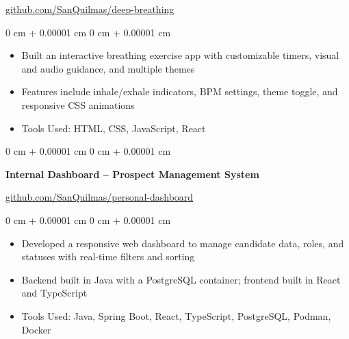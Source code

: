 \documentclass[10pt, letterpaper]{article}
\newenvironment{highlights}{
    \begin{itemize}[
        topsep=0.10 cm,
        parsep=0.10 cm,
        partopsep=0pt,
        itemsep=0pt,
        leftmargin=0 cm + 10pt
    ]
}{
    \end{itemize}
} %
\newenvironment{onecolentry}{
    \begin{adjustwidth}{
        0 cm + 0.00001 cm
    }{
        0 cm + 0.00001 cm
    }
}{
    \end{adjustwidth}
} %
\begin{document}
            \vspace{0.05 cm}
                \href{https://github.com/SanQuilmas/deep-breathing}{github.com/SanQuilmas/deep-breathing}
            \vspace{0.10 cm}
            \begin{onecolentry}
                \begin{highlights}
                    \item Built an interactive breathing exercise app with customizable timers, visual and audio guidance, and multiple themes
                    \item Features include inhale/exhale indicators, BPM settings, theme toggle, and responsive CSS animations
                    \item Tools Used: HTML, CSS, JavaScript, React
                \end{highlights}
            \end{onecolentry}
        \vspace{0.2 cm}
            \begin{onecolentry}
                \textbf{Internal Dashboard – Prospect Management System}
            \end{onecolentry}
            \vspace{0.05 cm}
                \href{https://github.com/SanQuilmas/personal-dashboard}{github.com/SanQuilmas/personal-dashboard}
            \vspace{0.10 cm}
            \begin{onecolentry}
                \begin{highlights}
                    \item Developed a responsive web dashboard to manage candidate data, roles, and statuses with real-time filters and sorting
                    \item Backend built in Java with a PostgreSQL container; frontend built in React and TypeScript
                    \item Tools Used: Java, Spring Boot, React, TypeScript, PostgreSQL, Podman, Docker
                \end{highlights}
            \end{onecolentry}
        
\end{document}
